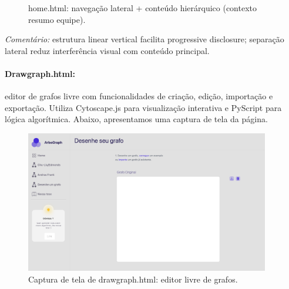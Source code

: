 \documentclass[12pt,a4paper]{article}
\def\texttt#1{#1}%
\def\emph#1{#1}%
\def\_{}%
\begin{document}
\begin{figure}[H]\centering
{}
\caption{\texttt{home.html}: navegação lateral + conteúdo hierárquico (contexto \textrightarrow resumo \textrightarrow equipe).}
\end{figure}
    \textit{Comentário:} estrutura linear vertical facilita \emph{progressive disclosure}; separação lateral reduz interferência visual com conteúdo principal.

\paragraph{\texttt{Draw\_graph.html}:} editor de grafos livre com funcionalidades de criação, edição, importação e exportação. Utiliza \texttt{Cytoscape.js} para visualização interativa e \texttt{PyScript} para lógica algorítmica. Abaixo, apresentamos uma captura de tela da página.

\begin{figure}[H]\centering
    \includegraphics[width=0.95\textwidth]{../assets/drawhtml.png}
    \caption{Captura de tela de \texttt{draw\_graph.html}: editor livre de grafos.}
    \label{fig:draw_html_screenshot}
\end{figure}
\end{document}
